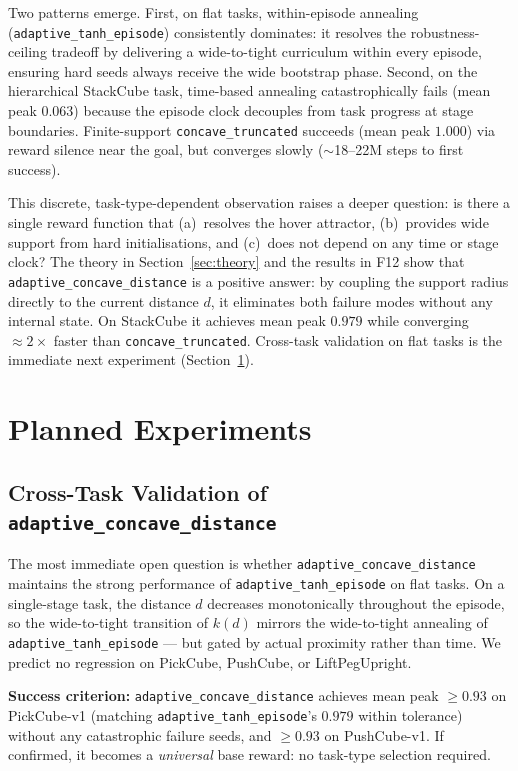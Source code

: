 \documentclass{article}
\begin{document}
Two patterns emerge. First, on flat tasks, within-episode annealing
(\texttt{adaptive\_tanh\_episode}) consistently dominates: it resolves the
robustness-ceiling tradeoff by delivering a wide-to-tight curriculum within every
episode, ensuring hard seeds always receive the wide bootstrap phase.
Second, on the hierarchical StackCube task, time-based annealing catastrophically
fails (mean peak $0.063$) because the episode clock decouples from task progress at
stage boundaries. Finite-support \texttt{concave\_truncated} succeeds (mean peak
$1.000$) via reward silence near the goal, but converges slowly ($\sim$18--22M steps
to first success).

This discrete, task-type-dependent observation raises a deeper question: is there a
single reward function that (a)~resolves the hover attractor, (b)~provides wide
support from hard initialisations, and (c)~does not depend on any time or stage
clock? The theory in Section~\ref{sec:theory} and the results in F12 show that
\texttt{adaptive\_concave\_distance} is a positive answer: by coupling the support
radius directly to the current distance $d$, it eliminates both failure modes without
any internal state. On StackCube it achieves mean peak $0.979$ while converging
$\approx\!2\times$ faster than \texttt{concave\_truncated}. Cross-task validation on
flat tasks is the immediate next experiment (Section~\ref{sec:planned}).

\section{Planned Experiments}
\label{sec:planned}

\subsection{Cross-Task Validation of \texttt{adaptive\_concave\_distance}}

The most immediate open question is whether \texttt{adaptive\_concave\_distance}
maintains the strong performance of \texttt{adaptive\_tanh\_episode} on flat tasks.
On a single-stage task, the distance $d$ decreases monotonically throughout the episode,
so the wide-to-tight transition of $k(d)$ mirrors the wide-to-tight annealing of
\texttt{adaptive\_tanh\_episode} --- but gated by actual proximity rather than time.
We predict no regression on PickCube, PushCube, or LiftPegUpright.

\textbf{Success criterion:} \texttt{adaptive\_concave\_distance} achieves mean peak
$\geq 0.93$ on PickCube-v1 (matching \texttt{adaptive\_tanh\_episode}'s $0.979$
within tolerance) without any catastrophic failure seeds, and $\geq 0.93$ on PushCube-v1.
If confirmed, it becomes a \emph{universal} base reward: no task-type selection required.
\end{document}
